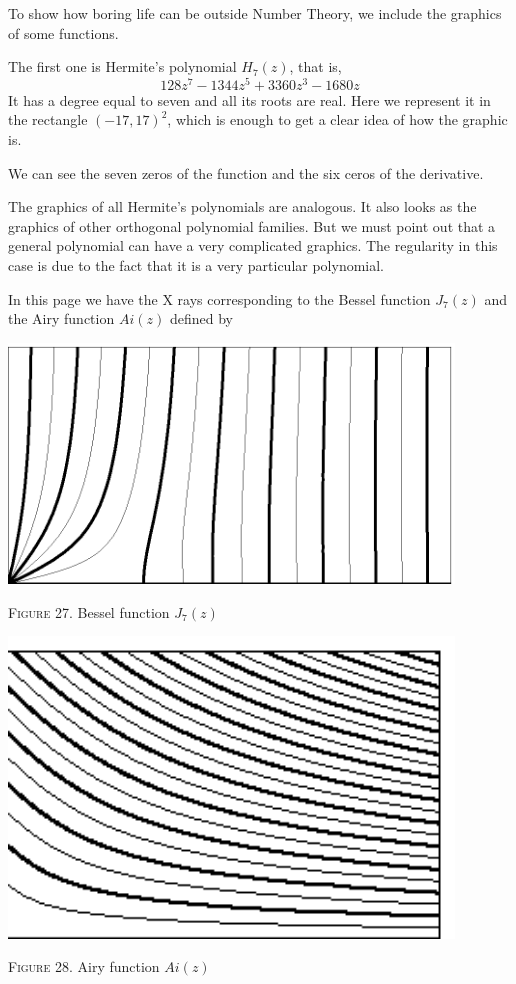 \documentclass[a4paper]{amsart}
\numberwithin{equation}{section}
\begin{document}
\begin{large}
    
    To show how boring life can be outside Number Theory, we include the graphics
of some functions.


The first one is Hermite's polynomial $H_7(z)$, that is,
$$   128 z^7- 1344 z^5+ 3360 z^3-1680 z $$
It has a degree equal to seven and all its roots are real. Here we represent it
in the rectangle $(-17, 17)^2$, which is enough to get a clear idea of how the
graphic is.

We can see the seven zeros of the function and the six ceros of the derivative.
\bigskip

The graphics of all Hermite's polynomials are analogous. It also looks 
as the
graphics of other orthogonal polynomial families. But we must point out that a
general polynomial can have a very complicated graphics. The regularity in this
case is due to the fact that it is a very particular polynomial.

In this page we have the X rays corresponding to the Bessel
function $J_7(z)$ and the Airy function $Ai(z)$ defined by


\end{large}
\begin{minipage}{335.7426pt}
\bigskip
\includegraphics[width=335pt]{figure50.ps}
\vfil
\centerline{{\scshape Figure} 27. Bessel function $J_{7}(z)$}
\bigskip
\includegraphics[width=335pt]{figure51.ps}
\vfil
\centerline{{\scshape Figure} 28.  Airy function $Ai(z)$}
\end{minipage}
\end{document}
